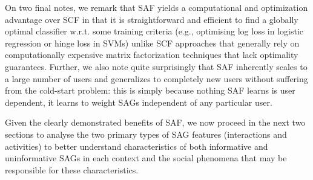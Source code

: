 On two final notes, we remark that SAF yields a computational and
optimization advantage over SCF in that it is straightforward and
efficient to find a globally optimal classifier w.r.t. some training
criteria (e.g., optimising log loss in logistic regression or hinge
loss in SVMs) unlike SCF approaches that generally rely on
computationally expensive matrix factorization techniques that lack
optimality guarantees.  Further, we also note quite surprisingly that
SAF inherently scales to a large number of users and generalizes to
completely new users without suffering from the cold-start problem:
this is simply because nothing SAF learns is user dependent, it learns
to weight SAGs independent of any particular user.

Given the clearly demonstrated benefits of SAF, we now proceed in the
next two sections to analyse the two primary types of SAG features
(interactions and activities) to better understand characteristics of
both informative and uninformative SAGs in each context and the social
phenomena that may be responsible for these characteristics.
